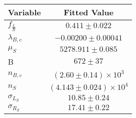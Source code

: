 \begin{tabular}[t]{lc}
\hline
Variable &Fitted Value\\
\hline\hline
$f_{\frac{L}{R}}$&$0.411\pm0.022$\\
\hline
$\lambda_{B,c}$&$-0.00200\pm0.00041$\\
\hline
$\mu_S$&$5278.911\pm0.085$\\
\hline
B&$672\pm37$\\
\hline
$n_{B,c}$&$(2.60\pm0.14)\times 10^3$\\
\hline
$n_S$&$(4.143\pm0.024)\times 10^4$\\
\hline
$\sigma_{L_S}$&$10.85\pm0.24$\\
\hline
$\sigma_{R_S}$&$17.41\pm0.22$\\
\hline
\end{tabular}